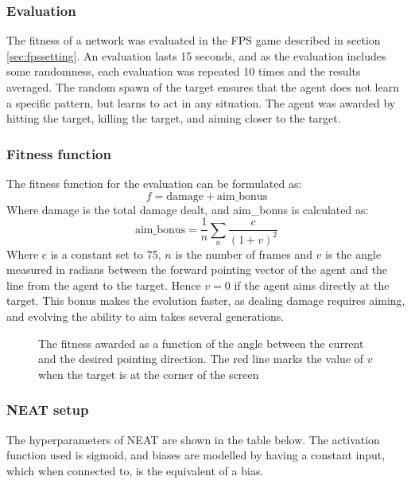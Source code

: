 \subsubsection{Evaluation}
The fitness of a network was evaluated in the FPS game described in section \ref{sec:fpssetting}. An evaluation lasts 15 seconds, and as the evaluation includes some randomness, each evaluation was repeated 10 times and the results averaged. The random spawn of the target ensures that the agent does not learn a specific pattern, but learns to act in any situation. The agent was awarded by hitting the target, killing the target, and aiming closer to the target.

\subsubsection{Fitness function}
The fitness function for the evaluation can be formulated as:
$$f = \text{damage} + \text{aim\_bonus}$$
Where damage is the total damage dealt, and aim\_bonus is calculated as:
$$ \text{aim\_bonus} = \frac{1}{n} \sum_{n} \frac{c}{(1+v)^2} $$
Where c is a constant set to 75, $n$ is the number of frames and $v$ is the angle measured in radians between the forward pointing vector of the agent and the line from the agent to the target. Hence $v = 0$ if the agent aims directly at the target. This bonus makes the evolution faster, as dealing damage requires aiming, and evolving the ability to aim takes several generations.
\begin{figure}[H]
\centering
{}
\caption{The fitness awarded as a function of the angle between the current and the desired pointing direction. The red line marks the value of $v$ when the target is at the corner of the screen}
\end{figure}

\subsubsection{NEAT setup}
The hyperparameters of NEAT are shown in the table below. The activation function used is sigmoid, and biases are modelled by having a constant input, which when connected to, is the equivalent of a bias.


